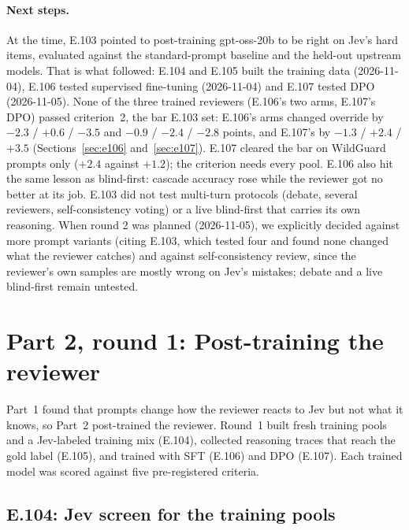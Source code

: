 \documentclass[11pt]{article}
\renewcommand{\_}{\origunderscore\allowbreak}
\begin{document}
\paragraph{Next steps.}
At the time, E.103 pointed to post-training gpt-oss-20b to be right on Jev's hard items, evaluated against the standard-prompt baseline and the held-out upstream models. That is what followed: E.104 and E.105 built the training data (2026-11-04), E.106 tested supervised fine-tuning (2026-11-04) and E.107 tested DPO (2026-11-05). None of the three trained reviewers (E.106's two arms, E.107's DPO) passed criterion~2, the bar E.103 set: E.106's arms changed override by $-2.3$ / $+0.6$ / $-3.5$ and $-0.9$ / $-2.4$ / $-2.8$ points, and E.107's by $-1.3$ / $+2.4$ / $+3.5$ (Sections~\ref{sec:e106} and~\ref{sec:e107}). E.107 cleared the bar on WildGuard prompts only ($+2.4$ against $+1.2$); the criterion needs every pool. E.106 also hit the same lesson as blind-first: cascade accuracy rose while the reviewer got no better at its job. E.103 did not test multi-turn protocols (debate, several reviewers, self-consistency voting) or a live blind-first that carries its own reasoning. When round 2 was planned (2026-11-05), we explicitly decided against more prompt variants (citing E.103, which tested four and found none changed what the reviewer catches) and against self-consistency review, since the reviewer's own samples are mostly wrong on Jev's mistakes; debate and a live blind-first remain untested.

\section{Part 2, round 1: Post-training the reviewer}\label{sec:part2r1}

Part~1 found that prompts change how the reviewer reacts to Jev but not what it knows, so Part~2 post-trained the reviewer. Round~1 built fresh training pools and a Jev-labeled training mix (E.104), collected reasoning traces that reach the gold label (E.105), and trained with SFT (E.106) and DPO (E.107). Each trained model was scored against five pre-registered criteria.

\subsection{E.104: Jev screen for the training pools}\label{sec:e104}
\end{document}
